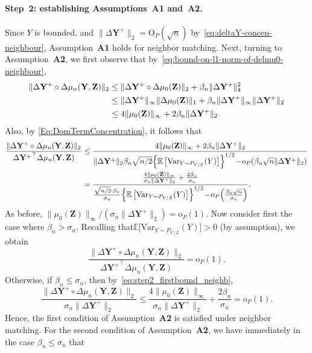 \documentclass[12pt]{article}
\newcommand{\EE}[1]{\mathbb{E}\left[{#1}\right]}
\newcommand{\VPst}[2]{\mathrm{Var}_{{#1}}({#2})}
\newcommand{\bY}{\mathbf{Y}}
\newcommand{\bZ}{\mathbf{Z}}
\begin{document}
    \paragraph{Step~2: establishing Assumptions~\textbf{A1} and~\textbf{A2}.} 
    Since $Y$ is bounded, and $\|\Delta\bY^+\|_2=\mathrm{O}_P(\sqrt{n})$ by~\eqref{eq:deltaY-concen-neighbour}, Assumption~\textbf{A1} holds for neighbor matching. Next, turning to Assumption~\textbf{A2}, we
    first observe that by~\eqref{eq:bound-on-l1-norm-of-delmu0-neighbour},
    \begin{align}
        \notag\|\Delta\bY^+\circ \Delta\mu_n(\bY,\bZ)\|_2 & \leq \|\Delta\bY^+\circ \Delta\mu_0(\bZ)\|_2+\beta_n \|\Delta\bY^+\|_4^2\\
        \notag&\leq \|\Delta\bY^+\|_\infty \|\Delta\mu_0(\bZ)\|_1 + \beta_n \|\Delta\bY^+\|_\infty \|\Delta\bY^+\|_2\\
        \label{eq:step2_firstbound_neighb}&\leq 4\|\mu_0(\bZ)\|_\infty+2\beta_n \|\Delta\bY^+\|_2.
    \end{align}
    Also, by \eqref{Eq:DomTermConcentration}, it follows that
    \begin{align*}
        \frac{\|\Delta\bY^+\circ \Delta\mu_n(\bY,\bZ)\|_2}{{\Delta\bY^+}^\top\Delta\mu_n(\bY,\bZ)}&\leq \frac{4\|\mu_0(\bZ)\|_\infty+2\beta_n \|\Delta\bY^+\|_2}{\|\Delta\bY^+\|_2\beta_n\sqrt{n/2}\Bigl\{\EE{\VPst{Y\sim P_{Y\mid Z}}{Y}}\Bigr\}^{1/2} \!-\! \mathrm{o}_P(\beta_n\sqrt{n}\|\Delta\bY^+\|_2)}\\
        &=\frac{\frac{4\|\mu_0(\bZ)\|_\infty}{\sigma_n\|\Delta\bY^+\|_2}+\frac{2\beta_n}{\sigma_n} }{\frac{\sqrt{n/2}\cdot\beta_n}{\sigma_n}\Bigl\{\EE{\VPst{Y\sim P_{Y\mid Z}}{Y}}\Bigr\}^{1/2} \!-\! \mathrm{o}_P\Bigl(\frac{\beta_n\sqrt{n}}{\sigma_n}\Bigr)}.
    \end{align*}
    As before, $\|\mu_0(\bZ)\|_\infty/(\sigma_n\|\Delta\bY^+\|_2) = \mathrm{o}_P(1)$. Now  consider first the case where $\beta_n > \sigma_n$.  Recalling that$\mathbb{E}\bigl[\VPst{Y\sim P_{Y\mid Z}}{Y}\bigr] > 0$ (by assumption), we obtain
    \[
    \frac{\|\Delta\bY^+\circ \Delta\mu_n(\bY,\bZ)\|_2}{{\Delta\bY^+}^\top\Delta\mu_n(\bY,\bZ)}=\mathrm{o}_P(1).
    \]
    Otherwise, if $\beta_n \leq \sigma_n$, then by~\eqref{eq:step2_firstbound_neighb}, 
    \[
    \frac{\|\Delta\bY^+\circ \Delta\mu_n(\bY,\bZ)\|_2}{\sigma_n \|\Delta\bY^+\|_2}\leq \frac{4\|\mu_0(\bZ)\|_\infty}{\sigma_n \|\Delta\bY^+\|_2} +\frac{2\beta_n}{\sigma_n}=\mathrm{o}_P(1).
    \]
    Hence, the first condition of Assumption~\textbf{A2} is satisfied under neighbor matching. For the second condition of Assumption~\textbf{A2}, we have immediately in the case $\beta_n \leq \sigma_n$ that 
\end{document}
